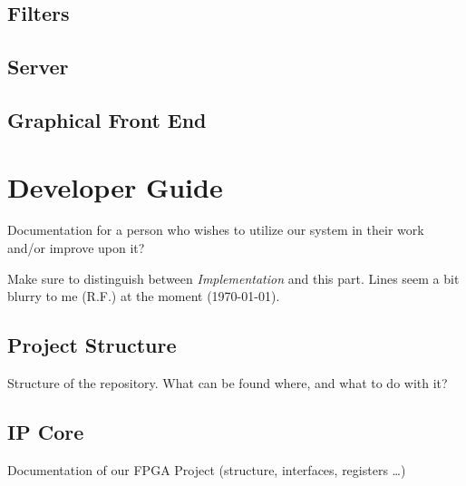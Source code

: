 \documentclass[a4paper,oneside]{alpenthesis/alpenthesis}
\begin{document}
\chapter{Filters} %
\label{ch:filters}


\chapter{Server} %
\label{ch:server}


\chapter{Graphical Front End} %
\label{ch:graphical_front_end}



\part{Developer Guide} %
\label{part:Developer_Guide}
Documentation for a person who wishes to utilize our system in their work and/or
improve upon it?

Make sure  to distinguish  between \emph{Implementation} and  this part. Lines
seem a bit blurry to me (R.F.) at the moment (\today).

\chapter{Project Structure} %
\label{ch:Project_Structure}
Structure of the repository. What can be found where, and what to do with it?


\chapter{IP Core} %
\label{ch:IP_Core}
Documentation of our FPGA Project (structure, interfaces, registers \ldots)
\end{document}
